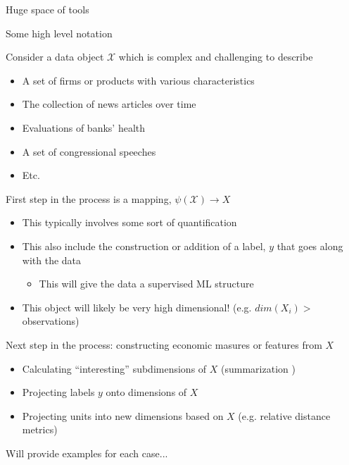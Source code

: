 \documentclass[notes,11pt, aspectratio=169]{beamer}
\newenvironment{wideitemize}{\itemize\addtolength{\itemsep}{10pt}}{\enditemize}
\begin{document}
\begin{frame}{Huge space of tools}
\end{frame}

\begin{frame}{Some high level notation}
  \begin{wideitemize}
  \item Consider a data object $\mathcal{X}$ which is complex and challenging to describe
    \begin{itemize}
    \item A set of firms or products with various characteristics
    \item The collection of news articles over time 
    \item Evaluations of banks' health
    \item A set of congressional speeches
    \item Etc.
    \end{itemize}
  \item First step in the process is a mapping, $\psi(\mathcal{X}) \rightarrow X$
    \begin{itemize}
    \item This typically involves some sort of quantification
    \item This also include the construction or addition of a label, $y$ that goes along with the data
      \begin{itemize}
      \item This will give the data a supervised ML structure
      \end{itemize}
    \item This object will likely be very high dimensional! (e.g. $dim(X_{i}) >$ observations)
    \end{itemize}
  \item Next step in the process: constructing economic masures or features from $X$
    \begin{itemize}
    \item Calculating ``interesting'' subdimensions of $X$ (summarization )
    \item Projecting labels $y$ onto dimensions of $X$
    \item Projecting units into new dimensions based on $X$ (e.g. relative distance metrics)
    \end{itemize}
  \item Will provide examples for each case...
  \end{wideitemize}
\end{frame}
\end{document}
